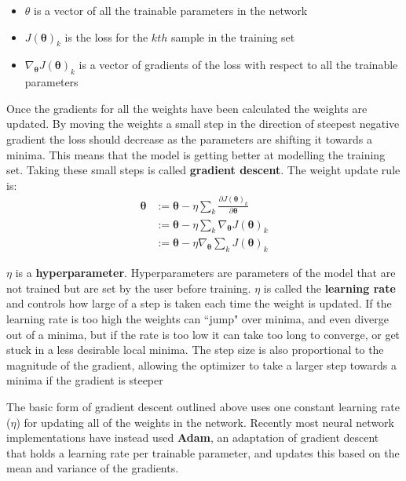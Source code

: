 \documentclass[12pt,a4paper,twoside,openright]{report}
\renewcommand{\vec}[1]{\bm{#1}}
\begin{document}
\begin{itemize}
  \item $\theta$ is a vector of all the trainable parameters in the network
  \item $J(\vec{\theta})_k$ is the loss for the $kth$ sample in the training set
  \item $\nabla_{\vec{\theta}} J(\vec{\theta})_k$ is a vector of gradients of the loss with respect to all the trainable parameters 
\end{itemize}

Once the gradients for all the weights have been calculated the weights are updated. By moving the weights a small step in the direction of steepest 
negative gradient the loss should decrease as the parameters are shifting it towards a minima. This means that the model is getting 
better at modelling the training set. Taking these small steps is called \textbf{gradient descent}. The weight update rule is: 
\begin{align}
  \vec{\theta} & := \mathbf{\vec{\theta}} - \eta \sum_{k} \frac{\partial J(\vec{\theta})_k}{\partial \mathbf{\vec{\theta}}} \\
  & := \mathbf{\vec{\theta}} - \eta \sum_{k} \nabla_{\vec{\theta}} J(\vec{\theta})_k \\
  & := \mathbf{\vec{\theta}} - \eta \nabla_{\vec{\theta}} \sum_{k} J(\vec{\theta})_k \label{eq:weight}
\end{align}

$\eta$ is a \textbf{hyperparameter}. Hyperparameters are parameters of the model that are not trained but are set by the user before training.
$\eta$ is called the \textbf{learning rate} and controls how large of a step is taken each time the weight is updated. If the learning rate is 
too high the weights can ``jump" over minima, and even diverge out of a minima, but if the rate is too low it can take too long to converge,
or get stuck in a less desirable local minima. The step size is also proportional to the magnitude of the gradient, allowing the optimizer to 
take a larger step towards a minima if the gradient is steeper

The basic form of gradient descent outlined above uses one constant learning rate ($\eta$) for updating all
of the weights in the network. Recently most neural network implementations have instead used \textbf{Adam}, an adaptation of gradient descent that holds
a learning rate per trainable parameter, and updates this based on the mean and variance of the gradients.
\end{document}
